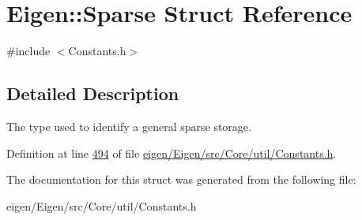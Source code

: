 \hypertarget{struct_eigen_1_1_sparse}{}\section{Eigen\+:\+:Sparse Struct Reference}
\label{struct_eigen_1_1_sparse}


{\ttfamily \#include $<$Constants.\+h$>$}



\subsection{Detailed Description}
The type used to identify a general sparse storage. 

Definition at line \hyperlink{eigen_2_eigen_2src_2_core_2util_2_constants_8h_source_l00494}{494} of file \hyperlink{eigen_2_eigen_2src_2_core_2util_2_constants_8h_source}{eigen/\+Eigen/src/\+Core/util/\+Constants.\+h}.



The documentation for this struct was generated from the following file\+:\begin{DoxyCompactItemize}
\item 
eigen/\+Eigen/src/\+Core/util/\+Constants.\+h\end{DoxyCompactItemize}
